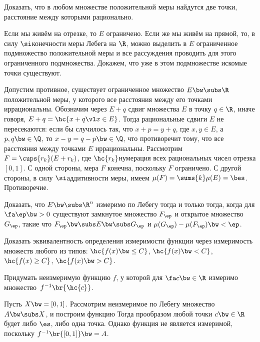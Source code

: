 \documentclass[a4paper,draft]{article}
\begin{document}
\begin{problem}
  Доказать, что в любом множестве положительной меры найдутся две точки, расстояние между
  которыми рационально.
\end{problem}
\begin{solution}
  Если мы живём на отрезке, то $E$ ограничено. Если же мы живём на прямой, то, в
  силу $\si$\д конечности меры Лебега на $\R$, можно выделить в $E$ ограниченное
  подмножество положительной меры и все рассуждения проводить для этого ограниченного
  подмножества. Докажем, что уже в этом подмножестве искомые точки существуют.

  Допустим противное,  существует ограниченное множество $E \bw\subs \R$ положительной меры,
  у которого все расстояния между его точками иррациональны. Обозначим через $E + q$ сдвиг
  множества $E$ в точку $q \in \R$, иначе говоря, $E + q = \hc{x + q \vl x \in E}$. Тогда
  рациональные сдвиги $E$ не пересекаются: если бы случилось так, что $x + p = y + q$,
  где $x, y \in E$, а $p,q \bw\in \Q$, то $x-y = q-p \bw\in \Q$, что противоречит тому,
  что все расстояния между точками $E$ иррациональны. Рассмотрим $F = \cups{r_k} (E + r_k)$,
  где $\hc{r_k}$\т нумерация всех рациональных чисел отрезка $[0,1]$. С одной стороны,
  мера $F$ конечна, поскольку $F$ ограничено. С другой стороны, в силу $\si$\д аддитивности
  меры, имеем $\mu(F) = \sums{k} \mu(E) = \bes$. Противоречие.
\end{solution}

\begin{problem}
  Доказать, что $E \bw\subs \R^n$ измеримо по Лебегу тогда и только тогда, когда для
  $\fa \ep \bw> 0$ существуют замкнутое множество $F_\ep$ и открытое множество~$G_\ep$, такие что
  $F_\ep \bw\subs E \bw\subs G_\ep$ и $\mu(G_\ep)-\mu(F_\ep) \bw< \ep$.
\end{problem}

\begin{problem}
  Доказать эквивалентность определения измеримости функции через измеримость множеств любого из типов:
  $\hc{f(x) \bw\le C}$, $\hc{f(x) \bw< C}$, $\hc{f(x) \ge C}$, $\hc{f(x) \bw> C}$.
\end{problem}

\begin{problem}\label{unmes.f.with.mes.coim.of.every.point}
  Придумать неизмеримую функцию $f$, у которой для $\fa c \bw\in \R$ измеримо
  множество~$f^{-1}\br{\hc{c}}$.
\end{problem}
\begin{solution}
  Пусть $X \bw= [0,1]$. Рассмотрим неизмеримое по Лебегу множество $A \bw\subs X$, и построим
  функцию
  Тогда прообразом любой точки $c \bw\in \R$ будет либо $\es$, либо одна точка. Однако функция
  не является измеримой, поскольку $f^{-1}\br{[0,1]} \bw= A$.
\end{solution}
\end{document}
